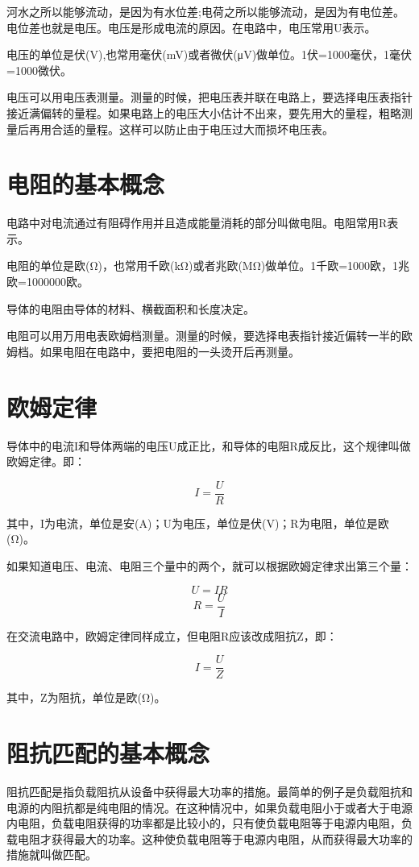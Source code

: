 \documentclass[12pt,UTF8]{ctexbook}
\begin{document}
河水之所以能够流动，是因为有水位差;电荷之所以能够流动，是因为有电位差。电位差也就是电压。电压是形成电流的原因。在电路中，电压常用U表示。

电压的单位是伏(V),也常用毫伏(mV)或者微伏(μV)做单位。1伏=1000毫伏，1毫伏=1000微伏。

电压可以用电压表测量。测量的时候，把电压表并联在电路上，要选择电压表指针接近满偏转的量程。如果电路上的电压大小估计不出来，要先用大的量程，粗略测量后再用合适的量程。这样可以防止由于电压过大而损坏电压表。

\section{电阻的基本概念}

电路中对电流通过有阻碍作用并且造成能量消耗的部分叫做电阻。电阻常用R表示。

电阻的单位是欧(Ω)，也常用千欧(kΩ)或者兆欧(MΩ)做单位。1千欧=1000欧，1兆欧=1000000欧。

导体的电阻由导体的材料、横截面积和长度决定。

电阻可以用万用电表欧姆档测量。测量的时候，要选择电表指针接近偏转一半的欧姆档。如果电阻在电路中，要把电阻的一头烫开后再测量。

\section{欧姆定律}

导体中的电流I和导体两端的电压U成正比，和导体的电阻R成反比，这个规律叫做欧姆定律。即：

\[ I = \frac{U}{R} \]

其中，I为电流，单位是安(A)；U为电压，单位是伏(V)；R为电阻，单位是欧(Ω)。

如果知道电压、电流、电阻三个量中的两个，就可以根据欧姆定律求出第三个量：

\[ U = IR \]
\[ R = \frac{U}{I} \]

在交流电路中，欧姆定律同样成立，但电阻R应该改成阻抗Z，即：

\[ I = \frac{U}{Z} \]

其中，Z为阻抗，单位是欧(Ω)。

\section{阻抗匹配的基本概念}

阻抗匹配是指负载阻抗从设备中获得最大功率的措施。最简单的例子是负载阻抗和电源的内阻抗都是纯电阻的情况。在这种情况中，如果负载电阻小于或者大于电源内电阻，负载电阻获得的功率都是比较小的，只有使负载电阻等于电源内电阻，负载电阻才获得最大的功率。这种使负载电阻等于电源内电阻，从而获得最大功率的措施就叫做匹配。
\end{document}
